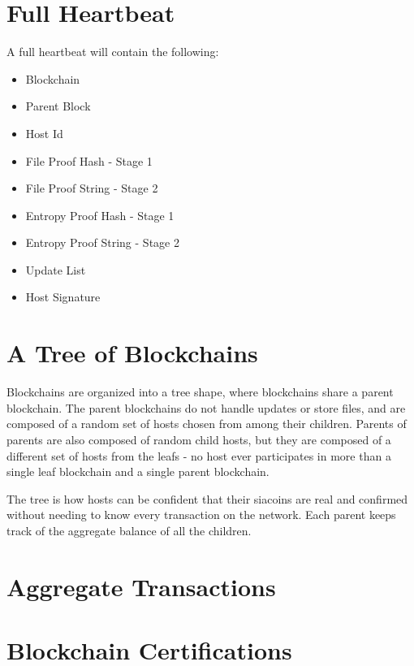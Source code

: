 \documentclass[twocolumn]{article}
\begin{document}

\section{Full Heartbeat}

A full heartbeat will contain the following:

\begin{itemize}
	\item Blockchain
	\item Parent Block
	\item Host Id
	\item File Proof Hash - Stage 1
	\item File Proof String - Stage 2
	\item Entropy Proof Hash - Stage 1
	\item Entropy Proof String - Stage 2
	\item Update List
	\item Host Signature
\end{itemize}

\section{A Tree of Blockchains}

Blockchains are organized into a tree shape, where \childrenperparent{} blockchains share a parent blockchain.
The parent blockchains do not handle updates or store files, and are composed of a random set of hosts chosen from among their children.
Parents of parents are also composed of random child hosts, but they are composed of a different set of hosts from the leafs - no host ever participates in more than a single leaf blockchain and a single parent blockchain.

The tree is how hosts can be confident that their siacoins are real and confirmed without needing to know every transaction on the network.
Each parent keeps track of the aggregate balance of all the children.

\section{Aggregate Transactions}

\section{Blockchain Certifications}
\end{document}
